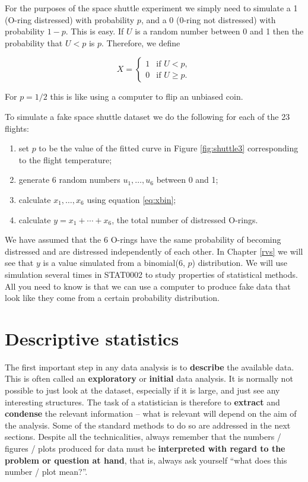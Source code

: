 \documentclass[
  british,
  11pt,
  openany, a4paper]{book}
\providecommand{\tightlist}{%
  \setlength{\itemsep}{0pt}\setlength{\parskip}{0pt}}
\begin{document}
For the purposes of the space shuttle experiment we simply need to simulate a 1 (O-ring distressed) with probability \(p\), and a 0 (0-ring not distressed) with probability \(1-p\). This is easy. If \(U\) is a random number between 0 and 1 then the probability that \(U < p\) is \(p\). Therefore, we define

\begin{equation}
X = 
\begin{cases} 
1 & \text{if } U < p, \\
0 & \text{if } U \geq p.
\end{cases}
\label{eq:xbin}
\end{equation}

For \(p=1/2\) this is like using a computer to flip an unbiased coin.

To simulate a fake space shuttle dataset we do the following for each of the 23 flights:

\begin{enumerate}
\def\labelenumi{\arabic{enumi}.}
\tightlist
\item
  set \(p\) to be the value of the fitted curve in Figure \ref{fig:shuttle3} corresponding to the flight temperature;
\item
  generate 6 random numbers \(u_1, \ldots, u_6\) between 0 and 1;
\item
  calculate \(x_1, \ldots, x_6\) using equation \eqref{eq:xbin};
\item
  calculate \(y=x_1+\cdots+x_6\), the total number of distressed O-rings.
\end{enumerate}

We have assumed that the 6 O-rings have the same probability of becoming distressed and are distressed independently of each other. In Chapter \ref{rvs} we will see that \(y\) is a value simulated from a binomial(6, \(p\)) distribution. We will use simulation several times in STAT0002 to study properties of statistical methods. All you need to know is that we can use a computer to produce fake data that look like they come from a certain probability distribution.

\chapter{Descriptive statistics}\label{descriptive}

The first important step in any data analysis is to \textbf{describe} the
available data. This is often called an \textbf{exploratory} or \textbf{initial} data analysis. It is normally not possible to just look at the dataset, especially if it is large, and just see any interesting structures. The task of a statistician is therefore to \textbf{extract} and \textbf{condense} the relevant information -- what is relevant will depend on the aim of the analysis. Some of the standard methods to do so are addressed in the next sections. Despite all the technicalities, always remember that the numbers / figures / plots produced for data must be \textbf{interpreted with regard to the problem or question at hand}, that is, always ask yourself ``what does this number / plot mean?''.
\end{document}
